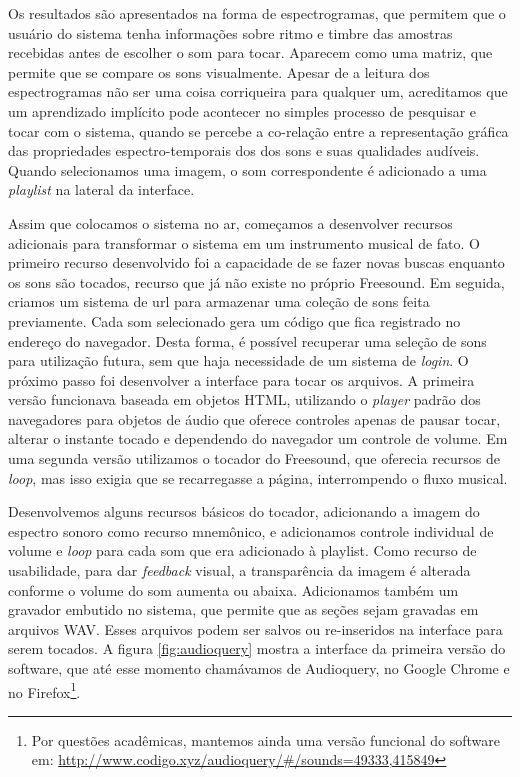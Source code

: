 Os resultados são apresentados na forma de espectrogramas, que permitem que o usuário do sistema tenha informações sobre ritmo e timbre das amostras recebidas antes de escolher o som para tocar. Aparecem como uma matriz, que permite que se compare os sons visualmente. Apesar de a leitura dos espectrogramas não ser uma coisa corriqueira para qualquer um, acreditamos que um aprendizado implícito pode acontecer no simples processo de pesquisar e tocar com o sistema, quando se percebe a co-relação entre a representação gráfica das propriedades espectro-temporais dos dos sons e suas qualidades audíveis. Quando selecionamos uma imagem, o som correspondente é adicionado a uma \emph{playlist} na lateral da interface.

 Assim que colocamos o sistema no ar, começamos a desenvolver recursos adicionais para transformar o sistema em um instrumento musical de fato. O primeiro recurso desenvolvido foi a capacidade de se fazer novas buscas enquanto os sons são tocados, recurso que já não existe no próprio Freesound. Em seguida, criamos um sistema de url para armazenar uma coleção de sons feita previamente. Cada som selecionado gera um código que fica registrado no endereço do navegador. Desta forma, é possível recuperar uma seleção de sons para utilização futura, sem que haja necessidade de um sistema de \emph{login}. O próximo passo foi desenvolver a interface para tocar os arquivos. A primeira versão funcionava baseada em objetos HTML, utilizando o \emph{player} padrão dos navegadores para objetos de áudio que oferece controles apenas de pausar tocar, alterar o instante tocado e dependendo do navegador um controle de volume. Em uma segunda versão utilizamos o tocador do Freesound, que oferecia recursos de \emph{loop}, mas isso exigia que se recarregasse a página, interrompendo o fluxo musical. 

 Desenvolvemos alguns recursos básicos do tocador, adicionando a imagem do espectro sonoro como recurso mnemônico, e adicionamos controle individual de volume e \emph{loop} para cada som que era adicionado à playlist. Como recurso de usabilidade, para dar \emph{feedback} visual, a transparência da imagem é alterada conforme o volume do som aumenta ou abaixa. Adicionamos também um gravador embutido no sistema, que permite que as seções sejam gravadas em arquivos WAV. Esses arquivos podem ser salvos ou re-inseridos na interface para serem tocados. A figura \ref{fig:audioquery} mostra a interface da primeira versão do software, que até esse momento chamávamos de Audioquery, no Google Chrome e no Firefox\footnote{Por questões acadêmicas, mantemos ainda uma versão funcional do software em: \url{http://www.codigo.xyz/audioquery/\#/sounds=49333,415849}}.

